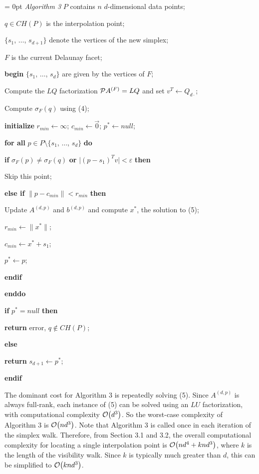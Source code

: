 {\parindent =0pt \parskip= 0pt
\smallskip
\leftskip 20pt
{\sl Algorithm 3}
\smallskip
$P$ contains $n$ $d$-dimensional data points;\par
$q \in CH(P)$ is the interpolation point;\par
$\{s_1$, $\ldots$, $s_{d+1}\}$ denote the vertices of the new simplex;\par
$F$ is the current Delaunay facet;\par
\smallskip
{\bf begin}
$\{s_1$, $\ldots$, $s_d\}$ are given by the vertices of $F$;\par
Compute the $LQ$ factorization ${\cal P}A^{(F)}=LQ$
and set $v^T \leftarrow Q_{d\cdot}$; \par
Compute $\sigma_F(q)$ using (4); \par
{\bf initialize} $r_{min} \leftarrow \infty$;
$c_{min} \leftarrow {\vec 0}$;
$p^* \leftarrow null$;\par
{\bf for all} $p \in P \setminus \{s_1$, $\ldots$, $s_d\}$ {\bf do}\par
\leftskip 40pt
{\bf if} $\sigma_F(p) \neq \sigma_F(q)$ {\bf or} 
$\bigl|(p - s_1)^T v\bigr| < \varepsilon$ {\bf then}\par
\leftskip 60pt
Skip this point;\par
\leftskip 40pt
{\bf else if} $\|p - c_{min}\| < r_{min}$ {\bf then}\par
\leftskip 60pt
Update $A^{(d,p)}$ and $b^{(d,p)}$ and compute $x^*$, the solution to (5);\par
$r_{min} \leftarrow \|x^*\|$;\par
$c_{min} \leftarrow x^* + s_1$;\par
$p^* \leftarrow p$;\par
\leftskip 40pt
{\bf endif}\par
\leftskip 20pt
{\bf enddo}\par
{\bf if} $p^* = null$ {\bf then} \par
\leftskip 40pt
{\bf return} error, $q \not\in CH(P)$;\par
\leftskip 20pt
{\bf else}\par
\leftskip 40pt
{\bf return} $s_{d+1} \leftarrow p^*$;\par
\leftskip 20pt
{\bf endif}
\smallskip}

The dominant cost for Algorithm 3 is repeatedly solving (5). Since
$A^{(d,p)}$ is always full-rank, each instance of (5) can be solved
using an $LU$ factorization, with computational complexity
${\cal O}\big(d^3\big)$. So the worst-case complexity of Algorithm 3
is ${\cal O}\big(nd^3\big)$.
Note that Algorithm 3 is called once in each iteration of the simplex
walk. Therefore, from Section 3.1 and 3.2, the overall computational
complexity for locating a single interpolation point is
${\cal O}\big(nd^4 + knd^3\big)$, where $k$ is the length of the
visibility walk.
Since $k$ is typically much greater than $d$, this can be simplified
to ${\cal O}\big(knd^3\big)$.

